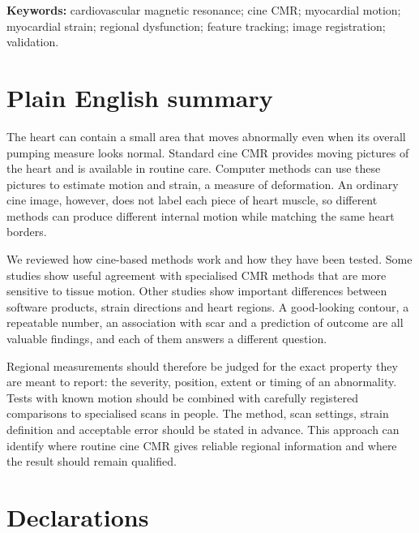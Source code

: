 \documentclass[11pt,a4paper]{article}
\begin{document}
\noindent\textbf{Keywords:} cardiovascular magnetic resonance; cine CMR; myocardial motion; myocardial strain; regional dysfunction; feature tracking; image registration; validation.

\section*{Plain English summary}
The heart can contain a small area that moves abnormally even when its overall pumping measure looks normal. Standard cine CMR provides moving pictures of the heart and is available in routine care. Computer methods can use these pictures to estimate motion and strain, a measure of deformation. An ordinary cine image, however, does not label each piece of heart muscle, so different methods can produce different internal motion while matching the same heart borders.

We reviewed how cine-based methods work and how they have been tested. Some studies show useful agreement with specialised CMR methods that are more sensitive to tissue motion. Other studies show important differences between software products, strain directions and heart regions. A good-looking contour, a repeatable number, an association with scar and a prediction of outcome are all valuable findings, and each of them answers a different question.

Regional measurements should therefore be judged for the exact property they are meant to report: the severity, position, extent or timing of an abnormality. Tests with known motion should be combined with carefully registered comparisons to specialised scans in people. The method, scan settings, strain definition and acceptable error should be stated in advance. This approach can identify where routine cine CMR gives reliable regional information and where the result should remain qualified.



\section*{Declarations}
\end{document}
